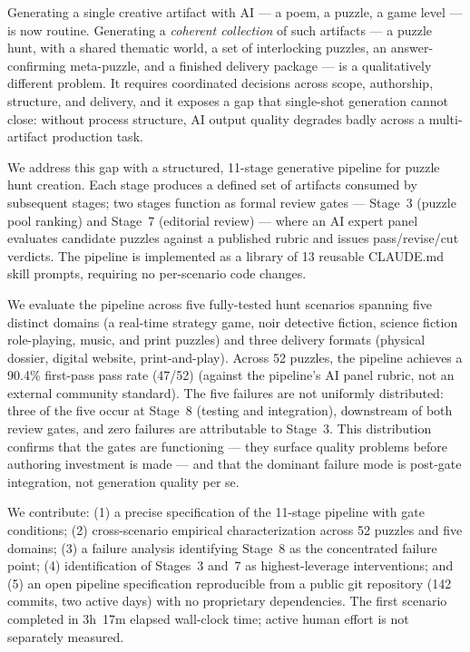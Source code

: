 Generating a single creative artifact with AI --- a poem, a puzzle, a game level --- is now
routine. Generating a \emph{coherent collection} of such artifacts --- a puzzle hunt, with a
shared thematic world, a set of interlocking puzzles, an answer-confirming meta-puzzle, and a
finished delivery package --- is a qualitatively different problem. It requires coordinated
decisions across scope, authorship, structure, and delivery, and it exposes a gap that
single-shot generation cannot close: without process structure, AI output quality degrades
badly across a multi-artifact production task.

We address this gap with a structured, 11-stage generative pipeline for puzzle hunt creation.
Each stage produces a defined set of artifacts consumed by subsequent stages; two stages
function as formal review gates --- Stage~3 (puzzle pool ranking) and Stage~7 (editorial
review) --- where an AI expert panel evaluates candidate puzzles against a published rubric
and issues pass/revise/cut verdicts. The pipeline is implemented as a library of 13 reusable
CLAUDE.md skill prompts, requiring no per-scenario code changes.

We evaluate the pipeline across five fully-tested hunt scenarios spanning five distinct domains
(a real-time strategy game, noir detective fiction, science fiction role-playing, music, and
print puzzles) and three delivery formats (physical dossier, digital website, print-and-play).
Across 52 puzzles, the pipeline achieves a 90.4\% first-pass pass rate (47/52) (against the pipeline's AI panel rubric, not an external community standard). The five
failures are not uniformly distributed: three of the five occur at Stage~8 (testing and
integration), downstream of both review gates, and zero failures are attributable to Stage~3.
This distribution confirms that the gates are functioning --- they surface quality problems
before authoring investment is made --- and that the dominant failure mode is post-gate
integration, not generation quality per se.

We contribute: (1) a precise specification of the 11-stage pipeline with gate conditions;
(2) cross-scenario empirical characterization across 52 puzzles and five domains; (3) a
failure analysis identifying Stage~8 as the concentrated failure point; (4) identification
of Stages~3 and~7 as highest-leverage interventions; and (5) an open pipeline specification
reproducible from a public git repository (142 commits, two active days) with no proprietary
dependencies. The first scenario completed in 3h~17m elapsed wall-clock time; active human effort is not separately measured.
